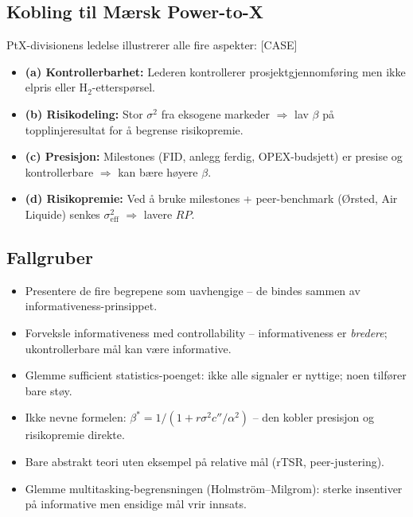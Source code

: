 \subsection*{Kobling til Mærsk Power-to-X}
PtX-divisionens ledelse illustrerer alle fire aspekter: [CASE]
\begin{itemize}\setlength{\itemsep}{2pt}
\item \textbf{(a) Kontrollerbarhet:} Lederen kontrollerer prosjektgjennomføring men ikke elpris eller H$_2$-etterspørsel.
\item \textbf{(b) Risikodeling:} Stor $\sigma^2$ fra eksogene markeder $\Rightarrow$ lav $\beta$ på topplinjeresultat for å begrense risikopremie.
\item \textbf{(c) Presisjon:} Milestones (FID, anlegg ferdig, OPEX-budsjett) er presise og kontrollerbare $\Rightarrow$ kan bære høyere $\beta$.
\item \textbf{(d) Risikopremie:} Ved å bruke milestones + peer-benchmark (Ørsted, Air Liquide) senkes $\sigma^2_{\text{eff}}$ $\Rightarrow$ lavere $RP$.
\end{itemize}

\subsection*{Fallgruber}
\begin{itemize}\setlength{\itemsep}{2pt}
\item Presentere de fire begrepene som uavhengige -- de bindes sammen av informativeness-prinsippet.
\item Forveksle informativeness med controllability -- informativeness er \emph{bredere}; ukontrollerbare mål kan være informative.
\item Glemme sufficient statistics-poenget: ikke alle signaler er nyttige; noen tilfører bare støy.
\item Ikke nevne formelen: $\beta^* = 1/(1+r\sigma^2 c''/\alpha^2)$ -- den kobler presisjon og risikopremie direkte.
\item Bare abstrakt teori uten eksempel på relative mål (rTSR, peer-justering).
\item Glemme multitasking-begrensningen (Holmström--Milgrom): sterke insentiver på informative men ensidige mål vrir innsats.
\end{itemize}

\FloatBarrier
